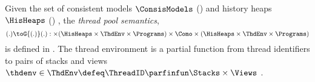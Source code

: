 
\begin{defn} 
\label{def:thread_pool_semantics}
\label{def:program_semantics}
Given the set of consistent models \( \ConsisModels \) () and history heaps \(\HisHeaps\) () , the \emph{thread pool semantics}, 
\[
	(.) \toG{(.)} (.): 
    \times ( \HisHeaps \times \ThdEnv \times \Programs) 
    \times \Como 
    \times ( \HisHeaps \times \ThdEnv \times \Programs) 
\]
is defined in .
The thread environment is a partial function from thread identifiers to pairs of stacks and views \( \thdenv \in \ThdEnv \defeq \ThreadID \parfinfun \Stacks \times \Views \) .
\end{defn}
 

